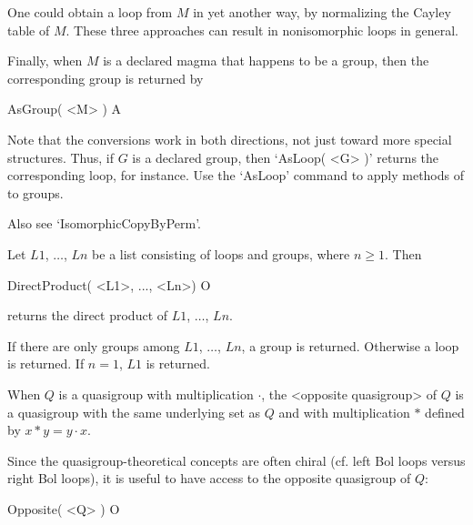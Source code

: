 One could obtain a loop from $M$ in yet another way, by normalizing the Cayley
table of $M$. These three approaches can result in nonisomorphic loops in
general.

Finally, when $M$ is a declared magma that happens to be a group, then the
corresponding group is returned by

\>AsGroup( <M> ) A

Note that the conversions work in both directions, not just toward more special
structures. Thus, if $G$ is a declared group, then `AsLoop( <G> )' returns the
corresponding loop, for instance. Use the `AsLoop' command to apply methods of
{\LOOPS} to groups.

Also see `IsomorphicCopyByPerm'.


\noindent Let $L1$, $\dots$, $Ln$ be a list consisting of loops and groups,
where $n\ge 1$. Then

\>DirectProduct( <L1>, ..., <Ln>) O

returns the direct product of $L1$, $\dots$, $Ln$.

If there are only groups among $L1$, $\dots$, $Ln$, a group is returned.
Otherwise a loop is returned. If $n=1$, $L1$ is returned.


When $Q$ is a quasigroup with multiplication $\cdot$, the <opposite quasigroup>
%
%
 of $Q$ is a quasigroup with the same underlying set as $Q$ and with
multiplication $*$ defined by $x*y=y\cdot x$.

Since the quasigroup-theoretical concepts are often chiral (cf. left Bol loops
versus right Bol loops), it is useful to have access to the opposite quasigroup
of $Q$:

\>Opposite( <Q> ) O
